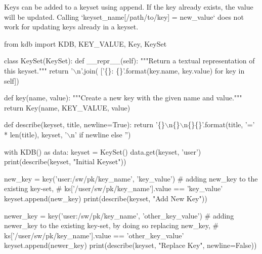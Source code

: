 Keys can be added to a keyset using {\ttfamily append}. If the key already exists, the value will be updated. Calling `keyset\+\_\+name\mbox{[}\textquotesingle{}/path/to/key\textquotesingle{}\mbox{]} = \textquotesingle{}new\+\_\+value` does not work for updating keys already in a keyset.


\begin{DoxyCode}
\textcolor{keyword}{from} kdb \textcolor{keyword}{import} KDB, KEY\_VALUE, Key, KeySet


\textcolor{keyword}{class }KeySet(KeySet):
    \textcolor{keyword}{def }\_\_repr\_\_(self):
        \textcolor{stringliteral}{"""Return a textual representation of this keyset."""}
        \textcolor{keywordflow}{return} \textcolor{stringliteral}{'\(\backslash\)n'}.join(
            [\textcolor{stringliteral}{'\{\}: \{\}'}.format(key.name, key.value) \textcolor{keywordflow}{for} key \textcolor{keywordflow}{in} self])


\textcolor{keyword}{def }key(name, value):
    \textcolor{stringliteral}{"""Create a new key with the given name and value."""}
    \textcolor{keywordflow}{return} Key(name, KEY\_VALUE, value)


\textcolor{keyword}{def }describe(keyset, title, newline=True):
    \textcolor{keywordflow}{return} \textcolor{stringliteral}{'\{\}\(\backslash\)n\{\}\(\backslash\)n\{\}\{\}'}.format(title, \textcolor{stringliteral}{'='} * len(title), keyset,
                                 \textcolor{stringliteral}{'\(\backslash\)n'} \textcolor{keywordflow}{if} newline \textcolor{keywordflow}{else} \textcolor{stringliteral}{''})


with KDB() \textcolor{keyword}{as} data:
    keyset = KeySet()
    data.get(keyset, \textcolor{stringliteral}{'user'})
    print(describe(keyset, \textcolor{stringliteral}{"Initial Keyset"}))

    new\_key = key(\textcolor{stringliteral}{'user:/sw/pk/key\_name'}, \textcolor{stringliteral}{'key\_value'})
    \textcolor{comment}{# adding new\_key to the existing key-set,}
    \textcolor{comment}{# ks['/user/sw/pk/key\_name'].value == 'key\_value'}
    keyset.append(new\_key)
    print(describe(keyset, \textcolor{stringliteral}{"Add New Key"}))

    newer\_key = key(\textcolor{stringliteral}{'user:/sw/pk/key\_name'}, \textcolor{stringliteral}{'other\_key\_value'})
    \textcolor{comment}{# adding newer\_key to the existing key-set, by doing so replacing new\_key,}
    \textcolor{comment}{# ks['/user/sw/pk/key\_name'].value == 'other\_key\_value'}
    keyset.append(newer\_key)
    print(describe(keyset, \textcolor{stringliteral}{"Replace Key"}, newline=\textcolor{keyword}{False}))
\end{DoxyCode}
 
